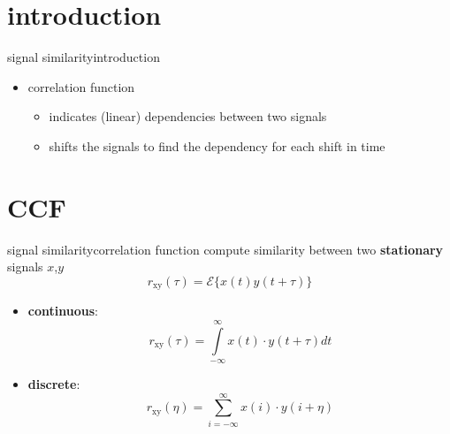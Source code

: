 



\subtitle{Part 5: Signal Similarity --- Correlation}


	

\section{introduction}
\begin{frame}{signal similarity}{introduction}
    \begin{itemize}
        \item   correlation function
            \begin{itemize}
                \item   indicates (linear) dependencies between two signals
                \item   shifts the signals to find the dependency for each shift in time
            \end{itemize}
    \end{itemize}
\end{frame}

\section{CCF}

\begin{frame}{signal similarity}{correlation function}
	compute similarity between two \textbf{stationary} signals $x$,$y$
    \begin{equation*}
        r_\mathrm{xy}(\tau)=\mathcal{E}\lbrace x(t)y(t+\tau)\rbrace  
    \end{equation*}  
	\pause
    
	\begin{itemize}
		\item	\textbf{continuous}:
            \begin{equation*}
                r_\mathrm{xy}(\tau) = \int\limits_{-\infty}^{\infty}{x(t)\cdot y(t+\tau)dt}
            \end{equation*}
		\item	\textbf{discrete}:
            \begin{equation*}
                r_\mathrm{xy}(\eta) = \sum\limits_{i=-\infty}^{\infty}{x(i)\cdot y(i+\eta)}
            \end{equation*}
	\end{itemize}
\end{frame}

